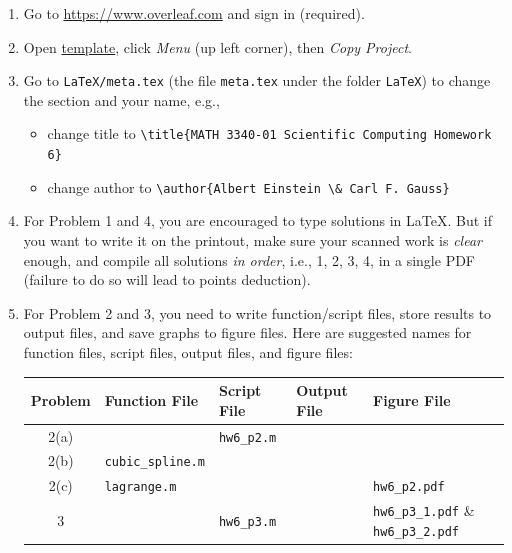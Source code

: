 \begin{enumerate}[label={\arabic*.}]
  \item Go to \url{https://www.overleaf.com} and sign in (required).
  \item Open \href{https://www.overleaf.com/read/vsnfpkmrggwv}{template}, click \emph{Menu} (up left corner), then \emph{Copy Project}.
  \item Go to \verb|LaTeX/meta.tex| (the file \verb|meta.tex| under the folder \verb|LaTeX|) to change the section and your name, e.g.,
    \begin{itemize}
      \item change title to \verb|\title{MATH 3340-01 Scientific Computing Homework 6}|
      \item change author to \verb|\author{Albert Einstein \& Carl F. Gauss}|
    \end{itemize}
  \item For Problem 1 and 4, you are encouraged to type solutions in \LaTeX{}. But if you want to write it on the printout, make sure your scanned work is \emph{clear} enough, and compile all solutions \emph{in order}, i.e., 1, 2, 3, 4, in a single PDF (failure to do so will lead to points deduction).
  \item For Problem 2 and 3, you need to write function/script files, store results to output files, and save graphs to figure files. Here are suggested names for function files, script files, output files, and figure files:
    \begin{table}[!hbtp]
      \centering
      \begin{tabular}{cllll}
        \toprule
        Problem & Function File         & Script File     & Output File & Figure File                                 \\
        \midrule
        2(a)    &                       & \verb|hw6_p2.m| &             &                                             \\
        2(b)    & \verb|cubic_spline.m| &                 &             &                                             \\
        2(c)    & \verb|lagrange.m|     &                 &             & \verb|hw6_p2.pdf|                           \\
        3       &                       & \verb|hw6_p3.m| &             & \verb|hw6_p3_1.pdf| \& \verb|hw6_p3_2.pdf|  \\
        \bottomrule
      \end{tabular}
    \end{table}


\end{enumerate}
